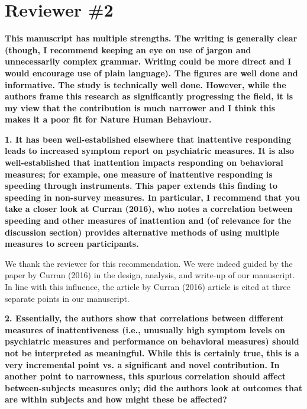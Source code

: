 \documentclass[a4paper,notitlepage,12pt]{article}
\begin{document}
\section*{Reviewer \#2}

\textbf{This manuscript has multiple strengths. The writing is generally clear (though, I recommend keeping an eye on use of jargon and unnecessarily complex grammar. Writing could be more direct and I would encourage use of plain language). The figures are well done and informative. The study is technically well done. However, while the authors frame this research as significantly progressing the field, it is my view that the contribution is much narrower and I think this makes it a poor fit for Nature Human Behaviour.}

\textbf{1. It has been well-established elsewhere that inattentive responding leads to increased symptom report on psychiatric measures. It is also well-established that inattention impacts responding on behavioral measures; for example, one measure of inattentive responding is speeding through instruments. This paper extends this finding to speeding in non-survey measures. In particular, I recommend that you take a closer look at Curran (2016), who notes a correlation between speeding and other measures of inattention and (of relevance for the discussion section) provides alternative methods of using multiple measures to screen participants.}

We thank the reviewer for this recommendation. We were indeed guided by the paper by Curran (2016) in the design, analysis, and write-up of our manuscript. In line with this influence, the article by Curran (2016) article is cited at three separate points in our manuscript.

\textbf{2. Essentially, the authors show that correlations between different measures of inattentiveness (i.e., unusually high symptom levels on psychiatric measures and performance on behavioral measures) should not be interpreted as meaningful. While this is certainly true, this is a very incremental point vs. a significant and novel contribution. In another point to narrowness, this spurious correlation should affect between-subjects measures only; did the authors look at outcomes that are within subjects and how might these be affected?}
\end{document}
